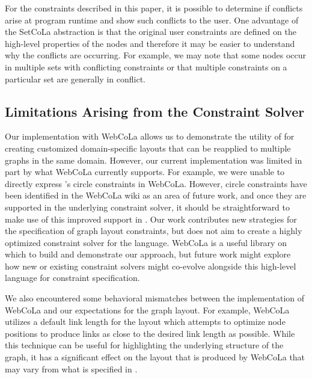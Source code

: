 For the constraints described in this paper, it is possible to determine if
conflicts arise at program runtime and show such conflicts to the user. One
advantage of the SetCoLa abstraction is that the original user constraints
are defined on the high-level properties of the nodes and therefore it may
be easier to understand why the conflicts are occurring. For example, we may
note that some nodes occur in multiple sets with conflicting constraints
or that multiple constraints on a particular set are generally in conflict.

\subsection{Limitations Arising from the Constraint Solver}



Our implementation with WebCoLa allows us to demonstrate the utility of
\projectname for creating customized domain-specific layouts that can be
reapplied to multiple graphs in the same domain. However, our current
implementation was limited in part by what WebCoLa currently supports. For
example, we were unable to directly express \projectname's circle constraints in
WebCoLa.  However, circle constraints have been identified in the WebCoLa
wiki as an area of future work, and once they are supported in the
underlying constraint solver, it should be straightforward to make use of
this improved support in \projectname.
Our work contributes new strategies for the
specification of graph layout constraints, but does not aim to create a
highly optimized constraint solver for the language. WebCoLa is a useful
library on which to build and demonstrate our approach, but 
future work might explore how new or existing constraint solvers might
co-evolve alongside this high-level language for constraint specification.

We also encountered some behavioral mismatches between the implementation
of WebCoLa and our expectations for the graph layout. For example, WebCoLa
utilizes a default link length for the layout which attempts to optimize
node positions to produce links as close to the desired link length as
possible. While this technique can be useful for highlighting the underlying 
structure of the graph, it has a significant effect on the layout that is
produced by WebCoLa that may vary from what is specified in \projectname.

